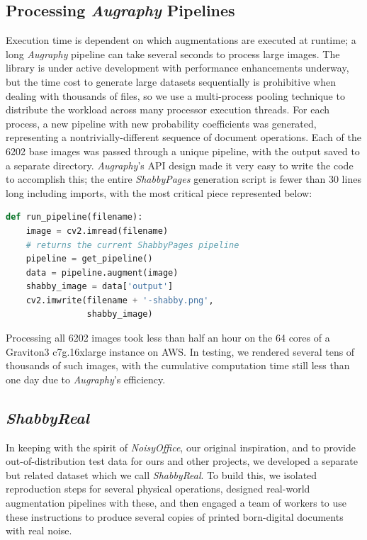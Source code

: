 \documentclass[runningheads]{llncs}
\begin{document}
\subsection{Processing \emph{Augraphy} Pipelines}
Execution time is dependent on which augmentations are executed at runtime; a long \emph{Augraphy} pipeline can take several seconds to process large images.
The library is under active development with performance enhancements underway, but the time cost to generate large datasets sequentially is prohibitive when dealing with thousands of files, so we use a multi-process pooling technique to distribute the workload across many processor execution threads.
For each process, a new pipeline with new probability coefficients was generated, representing a nontrivially-different sequence of document operations.
Each of the 6202 base images was passed through a unique pipeline, with the output saved to a separate directory.
\emph{Augraphy}'s API design made it very easy to write the code to accomplish this; the entire \emph{ShabbyPages} generation script is fewer than 30 lines long including imports, with the most critical piece represented below:

\begin{lstlisting}[language=Python]
  def run_pipeline(filename):
    image = cv2.imread(filename)
    # returns the current ShabbyPages pipeline
    pipeline = get_pipeline()
    data = pipeline.augment(image)
    shabby_image = data['output']
    cv2.imwrite(filename + '-shabby.png',
                shabby_image)
\end{lstlisting}

Processing all 6202 images took less than half an hour on the 64 cores of a Graviton3 c7g.16xlarge instance on AWS. In testing, we rendered several tens of thousands of such images, with the cumulative computation time still less than one day due to \emph{Augraphy}'s efficiency.

\subsection{\emph{ShabbyReal}}
In keeping with the spirit of \emph{NoisyOffice}, our original inspiration, and to provide out-of-distribution test data for ours and other projects, we developed a separate but related dataset which we call \emph{ShabbyReal}. To build this, we isolated reproduction steps for several physical operations, designed real-world augmentation pipelines with these, and then engaged a team of workers to use these instructions to produce several copies of printed born-digital documents with real noise.
\end{document}
